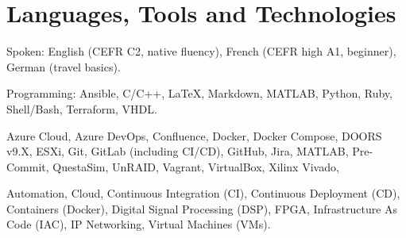 %
%
\section{Languages, Tools and Technologies}
\location{}
Spoken: \tab English (CEFR C2, native fluency), French (CEFR high A1, beginner), German (travel basics).

\vspace{0.25em}

Programming: \tab Ansible, C/C++, \LaTeX, Markdown, MATLAB, Python, Ruby, Shell/Bash, Terraform, VHDL.

\sectionsep{}
\location{}
Azure Cloud, Azure DevOps, Confluence, Docker, Docker Compose, DOORS v9.X, ESXi, Git, GitLab (including CI/CD), GitHub, Jira, MATLAB, Pre-Commit, QuestaSim, UnRAID, Vagrant, VirtualBox, Xilinx Vivado,

\sectionsep{}
\location{}
Automation, Cloud, Continuous Integration (CI), Continuous Deployment (CD), Containers (Docker), Digital Signal Processing (DSP), FPGA, Infrastructure As Code (IAC), IP Networking, Virtual Machines (VMs).

\sectionsep{}
